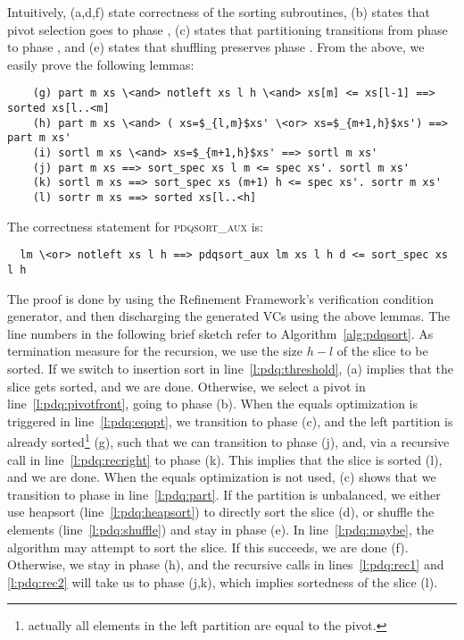 \documentclass[runningheads]{llncs}
\begin{document}
  Intuitively, (a,d,f) state correctness of the sorting subroutines, (b) states that pivot selection goes to phase ,
  (c) states that partitioning transitions from phase  to phase , and (e) states that shuffling preserves phase .
  From the above, we easily prove the following lemmas:
  \begin{lstlisting}
    (g) part m xs \<and> notleft xs l h \<and> xs[m] <= xs[l-1] ==> sorted xs[l..<m]
    (h) part m xs \<and> ( xs=$_{l,m}$xs' \<or> xs=$_{m+1,h}$xs') ==> part m xs'
    (i) sortl m xs \<and> xs=$_{m+1,h}$xs' ==> sortl m xs'
    (j) part m xs ==> sort_spec xs l m <= spec xs'. sortl m xs'
    (k) sortl m xs ==> sort_spec xs (m+1) h <= spec xs'. sortr m xs'
    (l) sortr m xs ==> sorted xs[l..<h]
  \end{lstlisting}
  The correctness statement for \textsc{pdqsort\_aux} is:
  \begin{lstlisting}
  lm \<or> notleft xs l h ==> pdqsort_aux lm xs l h d <= sort_spec xs l h
  \end{lstlisting}
  The proof is done by using the Refinement Framework's verification condition generator, and then discharging the generated VCs using the above lemmas.
  The line numbers in the following brief sketch refer to Algorithm~\ref{alg:pdqsort}.
  As termination measure for the recursion, we use the size $h-l$ of the slice to be sorted.
  If we switch to insertion sort in line~\ref{l:pdq:threshold}, (a) implies that the slice gets sorted, and we are done.
  Otherwise, we select a pivot in line~\ref{l:pdq:pivotfront}, going to phase  (b).
  When the equals optimization is triggered in line~\ref{l:pdq:eqopt}, we transition to phase  (c),
  and the left partition is already sorted\footnote{actually all elements in the left partition are equal to the pivot.} (g), such that we can transition to phase  (j), and, via a recursive call in line~\ref{l:pdq:recright}
  to phase  (k). This implies that the slice is sorted (l), and we are done.
  When the equals optimization is not used, (c) shows that we transition to phase  in line~\ref{l:pdq:part}.
  If the partition is unbalanced, we either use heapsort (line~\ref{l:pdq:heapsort}) to directly sort the slice (d),
  or shuffle the elements (line~\ref{l:pdq:shuffle}) and stay in phase  (e).
  In line~\ref{l:pdq:maybe}, the algorithm may attempt to sort the slice.
  If this succeeds, we are done (f). Otherwise, we stay in phase  (h),
  and the recursive calls in lines~\ref{l:pdq:rec1} and \ref{l:pdq:rec2} will take us to
  phase  (j,k), which implies sortedness of the slice (l).
\end{document}
